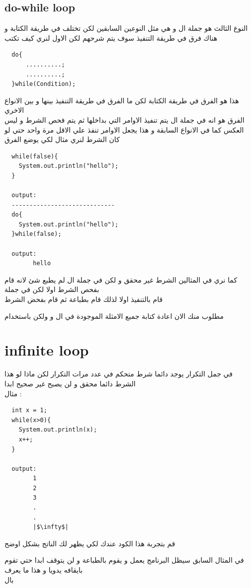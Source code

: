 \subsection{do-while loop}
\begin{AR}
  النوع الثالث هو جملة ال  و هي مثل النوعين السابقين لكن تختلف في طريقة الكتابة و هناك فرق في طريقة التنفيذ سوف يتم شرحهم
  لكن الاول لنري كيف تكتب
\end{AR}
\begin{verbatim}
  do{
      ..........;
      ..........;
  }while(Condition);
\end{verbatim}
\begin{AR}
  هذا هو الفرق في طريقة الكتابة لكن ما الفرق في طريقة التنفيذ بينها و بين الانواع الاخري
  \\
  الفرق هو انه في جملة ال  يتم تنفيذ الاوامر التي بداخلها ثم يتم فحص الشرط و ليس العكس كما في الانواع السابقة
  و هذا يجعل الاوامر تنفذ علي الاقل مرة واحد حتي لو كان الشرط  لنري مثال لكي يوضع الفرق
\end{AR}
\begin{verbatim}
  while(false){
    System.out.println("hello");
  }

  output: 
  -----------------------------
  do{
    System.out.println("hello");
  }while(false);

  output: 
        hello
\end{verbatim}
\begin{AR}
  كما نري في المثالين الشرط غير محقق و لكن في جملة ال  لم يطبع شئ لانه قام بفحص الشرط اولا لكن 
  في جملة \\
   قام بالتنفيذ اولا لذلك قام بطباعة  ثم قام بفحض الشرط 
\end{AR}
\begin{task}
  \begin{AR}
    مطلوب منك الان اعادة كتابة جميع الامثلة الموجودة في ال  و  ولكن باستخدام 
  \end{AR}
\end{task}
\newpage
\section{infinite loop}
\begin{AR}
  في جمل التكرار يوجد دائما شرط متحكم في عدد مرات التكرار 
  لكن ماذا لو هذا الشرط دائما محقق و لن يصبح غير صحيح ابدا 
  \\
  مثال :
\end{AR}
\begin{verbatim}
  int x = 1;
  while(x>0){
    System.out.println(x);
    x++;
  }

  output: 
        1
        2
        3
        .
        .
        |$\infty$|
\end{verbatim}
\begin{AR}
  قم بتجربة هذا الكود عندك لكي يظهر لك الناتج بشكل اوضح
  \par
  في المثال السابق سيظل البرنامج يعمل و يقوم بالطباعة و لن يتوقف ابدا 
  حتي تقوم بايقافه يدويا
  و هذا ما يعرف
  \\
  بال  
\end{AR}
